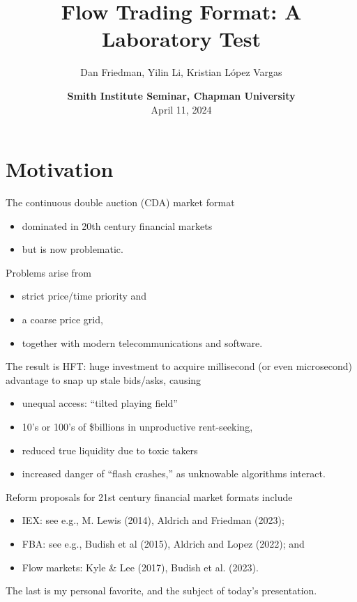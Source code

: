 \documentclass[10pt]{beamer}
\title[FlowTrading]{Flow Trading Format: A Laboratory Test}
\author[DF-YL-KL]{Dan Friedman, Yilin Li, Kristian L\'opez Vargas}
\institute[Essex, UCSC]{University of Essex and 
University of California, Santa Cruz}
\date[4/11/2024]{\textbf{Smith Institute Seminar, Chapman University} \\
April 11, 2024}
\begin{document}
\maketitle

\tableofcontents

\section{Motivation}
\begin{frame}{
The continuous double auction (CDA) market format}
\begin{itemize}
\item dominated in 20th century financial markets 
\item but is now problematic.  %
\end{itemize}
Problems arise from
\begin{itemize}
\item strict price/time priority and 
\item a coarse price grid, 
\item together with modern telecommunications and software.
\end{itemize} %
The result is HFT: huge investment to acquire millisecond (or even microsecond) advantage to snap up stale bids/asks, causing
\begin{itemize}
\item unequal access: ``tilted playing field''
\item 10's or 100's of \$billions in unproductive rent-seeking, %
\item reduced true liquidity due to toxic takers %
\item increased danger of ``flash crashes,'' as unknowable algorithms interact.
   \end{itemize}
\end{frame}

\begin{frame}{Reform proposals}
for 21st century financial market formats include
    \begin{itemize}
\item IEX: see e.g., M. Lewis (2014), Aldrich and Friedman (2023); %
\item FBA: see e.g., Budish et al (2015), Aldrich and Lopez (2022); and %
\item Flow markets:  Kyle \& Lee (2017), Budish et al. (2023).
\end{itemize}
The last is my personal favorite, and the subject of today's presentation.
\end{frame}
\end{document}
